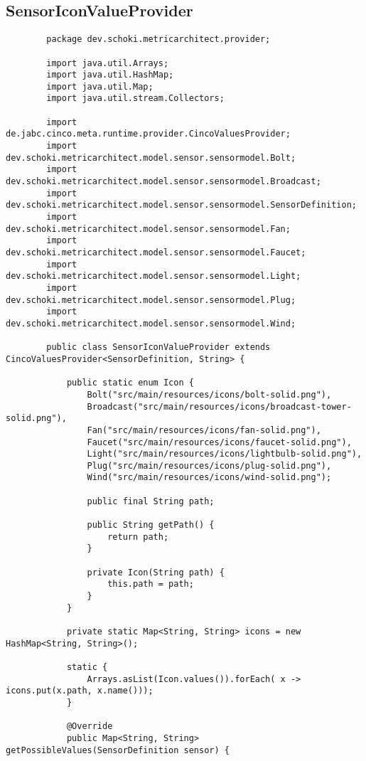 \subsection{SensorIconValueProvider}
\begin{longlisting}
	\begin{verbatim}
		package dev.schoki.metricarchitect.provider;
		
		import java.util.Arrays;
		import java.util.HashMap;
		import java.util.Map;
		import java.util.stream.Collectors;
		
		import de.jabc.cinco.meta.runtime.provider.CincoValuesProvider;
		import dev.schoki.metricarchitect.model.sensor.sensormodel.Bolt;
		import dev.schoki.metricarchitect.model.sensor.sensormodel.Broadcast;
		import dev.schoki.metricarchitect.model.sensor.sensormodel.SensorDefinition;
		import dev.schoki.metricarchitect.model.sensor.sensormodel.Fan;
		import dev.schoki.metricarchitect.model.sensor.sensormodel.Faucet;
		import dev.schoki.metricarchitect.model.sensor.sensormodel.Light;
		import dev.schoki.metricarchitect.model.sensor.sensormodel.Plug;
		import dev.schoki.metricarchitect.model.sensor.sensormodel.Wind;
		
		public class SensorIconValueProvider extends CincoValuesProvider<SensorDefinition, String> {
			
			public static enum Icon {
				Bolt("src/main/resources/icons/bolt-solid.png"),
				Broadcast("src/main/resources/icons/broadcast-tower-solid.png"),
				Fan("src/main/resources/icons/fan-solid.png"),
				Faucet("src/main/resources/icons/faucet-solid.png"),
				Light("src/main/resources/icons/lightbulb-solid.png"),
				Plug("src/main/resources/icons/plug-solid.png"),
				Wind("src/main/resources/icons/wind-solid.png");
				
				public final String path;
				
				public String getPath() {
					return path;
				}
				
				private Icon(String path) {
					this.path = path;
				}
			}
			
			private static Map<String, String> icons = new HashMap<String, String>();
			
			static {
				Arrays.asList(Icon.values()).forEach( x -> icons.put(x.path, x.name()));
			}
			
			@Override
			public Map<String, String> getPossibleValues(SensorDefinition sensor) {
				

\end{verbatim}
\end{longlisting}
